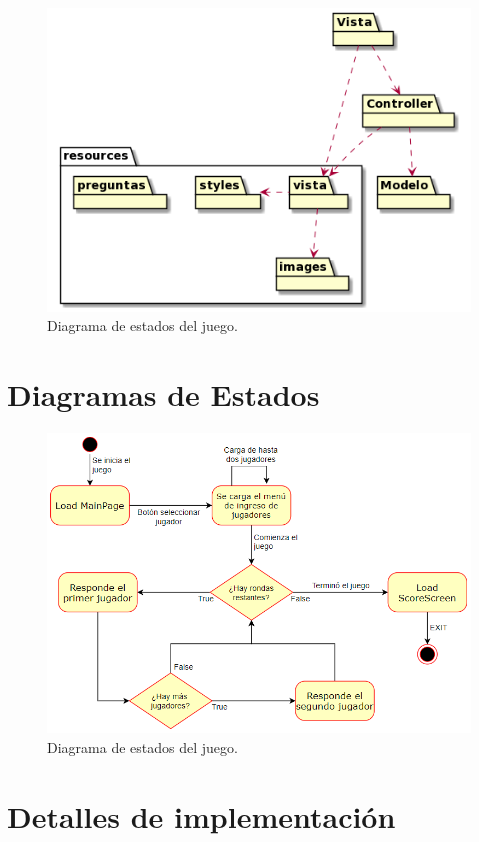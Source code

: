 \documentclass[titlepage,a4paper]{article}
\begin{document}
\begin{figure}[H]
\centering
\includegraphics[width=1\textwidth]{img/UMLPaquetes.png}
\caption{\label{fig:class01}Diagrama de estados del juego.}
\end{figure}

\section{Diagramas de Estados}

\begin{figure}[H]
\centering
\includegraphics[width=1\textwidth]{img/UMLEstados.png}
\caption{\label{fig:class01}Diagrama de estados del juego.}
\end{figure}

\section{Detalles de implementación}
\end{document}
